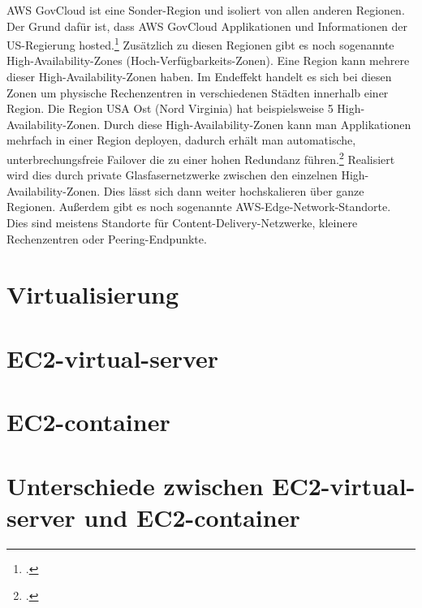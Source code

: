 \documentclass[titlepage]{report}
\begin{document}
AWS GovCloud ist eine Sonder\hyp{}Region und isoliert von allen anderen
Regionen. Der Grund dafür ist, dass AWS GovCloud Applikationen und
Informationen der US\hyp{}Regierung hosted.\footcite{govcloud} Zusätzlich zu
diesen Regionen gibt es noch sogenannte High\hyp{}Availability\hyp{}Zones
(Hoch\hyp{}Verfügbarkeits\hyp{}Zonen). Eine Region kann mehrere dieser
High\hyp{}Availability\hyp{}Zonen haben. Im Endeffekt handelt es sich bei
diesen Zonen um physische Rechenzentren in verschiedenen Städten innerhalb
einer Region. Die Region USA Ost (Nord Virginia) hat beispielsweise 5
High\hyp{}Availability\hyp{}Zonen. Durch diese
High\hyp{}Availability\hyp{}Zonen kann man Applikationen mehrfach in einer
Region deployen, dadurch erhält man automatische, unterbrechungsfreie Failover
die zu einer hohen Redundanz führen.\footcite{region} Realisiert wird dies
durch private Glasfasernetzwerke zwischen den einzelnen
High\hyp{}Availability\hyp{}Zonen. Dies lässt sich dann weiter hochskalieren
über ganze Regionen. Außerdem gibt es noch sogenannte
AWS\hyp{}Edge\hyp{}Network\hyp{}Standorte. Dies sind meistens Standorte für
Content\hyp{}Delivery-Netzwerke, kleinere Rechenzentren oder
Peering\hyp{}Endpunkte.
\section{Virtualisierung}
\section{EC2\hyp{}virtual\hyp{}server}
\section{EC2\hyp{}container}
\section{Unterschiede zwischen EC2\hyp{}virtual\hyp{}server und EC2\hyp{}container}
\nocite{*}
\printbibliography
\listoffigures
\end{document}
